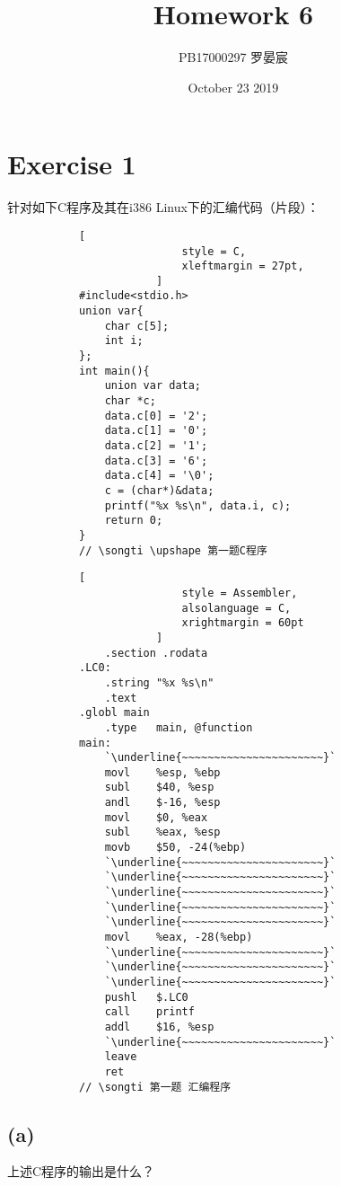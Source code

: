 \documentclass{article}
\title{Homework 6}
\author{PB17000297 罗晏宸}
\date{October 23 2019}
\begin{document}
\maketitle

\section*{Exercise 1}
针对如下C程序及其在i386 Linux下的汇编代码（片段）：
\begin{figure}
    \begin{multicols}{2}
        \begin{figure}[H]
            \centering
            \begin{lstlisting}[
                style = C,
                xleftmargin = 27pt,
            ]
#include<stdio.h>
union var{
    char c[5];
    int i;
};
int main(){
    union var data;
    char *c;
    data.c[0] = '2';
    data.c[1] = '0';
    data.c[2] = '1';
    data.c[3] = '6';
    data.c[4] = '\0';
    c = (char*)&data;
    printf("%x %s\n", data.i, c);
    return 0;
}
// \songti \upshape 第一题C程序
        \end{lstlisting}
        \end{figure}
        \begin{figure}[H]
            \centering
            \begin{lstlisting}[
                style = Assembler,
                alsolanguage = C,
                xrightmargin = 60pt
            ]
    .section .rodata
.LC0:
    .string "%x %s\n"
    .text
.globl main
    .type   main, @function
main:
    `\underline{~~~~~~~~~~~~~~~~~~~~~~}`
    movl    %esp, %ebp
    subl    $40, %esp
    andl    $-16, %esp
    movl    $0, %eax
    subl    %eax, %esp
    movb    $50, -24(%ebp)
    `\underline{~~~~~~~~~~~~~~~~~~~~~~}`
    `\underline{~~~~~~~~~~~~~~~~~~~~~~}`
    `\underline{~~~~~~~~~~~~~~~~~~~~~~}`
    `\underline{~~~~~~~~~~~~~~~~~~~~~~}`
    `\underline{~~~~~~~~~~~~~~~~~~~~~~}`
    movl    %eax, -28(%ebp)
    `\underline{~~~~~~~~~~~~~~~~~~~~~~}`
    `\underline{~~~~~~~~~~~~~~~~~~~~~~}`
    `\underline{~~~~~~~~~~~~~~~~~~~~~~}`
    pushl   $.LC0
    call    printf
    addl    $16, %esp
    `\underline{~~~~~~~~~~~~~~~~~~~~~~}`
    leave
    ret
// \songti 第一题 汇编程序
            \end{lstlisting}
        \end{figure}
    \end{multicols}
\end{figure}
\subsection*{(a)}
上述C程序的输出是什么？
\end{document}

